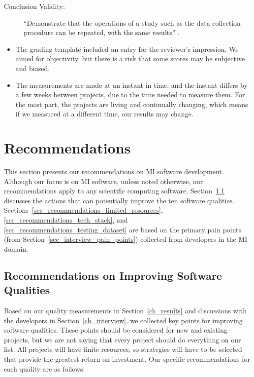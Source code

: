 \documentclass[final, 3p, times, authoryear]{elsarticle}
\begin{document}
\begin{description}
    \item[Conclusion Validity:] ``Demonstrate that the operations of a study
    such as the data collection procedure can be repeated, with the same
    results'' \citep{ZhouEtAl2016}.
\end{description}

\begin{itemize}
\item The grading template included an entry for the reviewer's impression.  We
aimed for objectivity, but there is a risk that some scores may be subjective
and biased.
\item The measurements are made at an instant in time, and the instant differs
by a few weeks between projects, due to the time needed to measure them. For the
most part, the projects are living and continually changing, which means if we
measured at a different time, our results may change.
\end{itemize}

\section{Recommendations} \label{ch_recommendations}

This section presents our recommendations on MI software development. Although
our focus is on MI software, unless noted otherwise, our recommendations apply
to any scientific computing software.
Section~\ref{sec_recommendations_qualities} discusses the actions that can
potentially improve the ten software qualities.
Sections~\ref{sec_recommendations_limited_resources},
\ref{sec_recommendations_tech_stack}, and
\ref{sec_recommendations_testing_dataset} are based on the primary pain points
(from Section~\ref{sec_interview_pain_points}) collected from developers in the
MI domain.

\subsection{Recommendations on Improving Software Qualities}
\label{sec_recommendations_qualities}

Based on our quality measurements in Section~\ref{ch_results} and discussions
with the developers in Section~\ref{ch_interview}, we collected key points for
improving software qualities. These points should be considered for new and
existing projects, but we are not saying that every project should do everything
on our list.  All projects will have finite resources, so strategies will have
to be selected that provide the greatest return on investment.  Our specific
recommendations for each quality are as follows:
\end{document}
